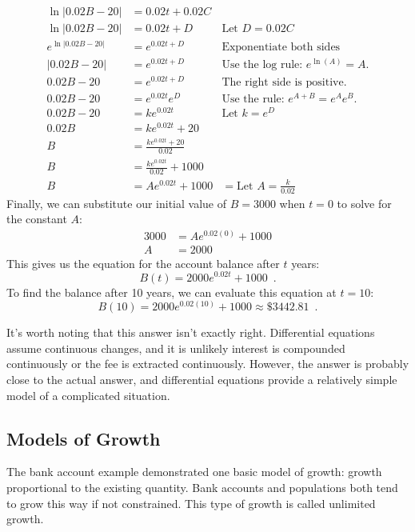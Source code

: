 \begin{example}
\begin{solution}
\begin{align*}
\ln|0.02B-20|     &= 0.02t+0.02C  \\
\ln|0.02B-20|     &= 0.02t+D      & \text{Let }D=0.02C\\
e^{\ln|0.02B-20|} &= e^{0.02t+D}  & \text{Exponentiate both sides}\\
|0.02B-20|        &= e^{0.02t+D}  & \text{Use the log rule: } e^{\ln(A)}=A.\\
0.02B-20          &= e^{0.02t+D}  & \text{The right side is positive.}\\
0.02B-20          &= e^{0.02t}e^D & \text{Use the rule: } e^{A+B}=e^Ae^B.\\
0.02B-20          &= ke^{0.02t}   & \text{Let } k=e^D\\
0.02B             &= ke^{0.02t} + 20   \\
B                 &= \frac{ke^{0.02t} + 20}{0.02} \\
B                 &= \frac{ke^{0.02t}}{0.02} + 1000 \\
B                 &= Ae^{0.02t}+1000 &= \text{Let } A = \frac{k}{0.02}
\end{align*}
Finally, we can substitute our initial value of $B=3000$ when $t=0$ to solve for the constant $A$:
\begin{align*}
3000  &= Ae^{0.02(0)}+1000 \\
A     &= 2000
\end{align*}
This gives us the equation for the account balance after $t$ years:
$$B(t)=2000e^{0.02t}+1000 \enspace .$$
To find the balance after 10 years, we can evaluate this equation at $t=10$:
$$B(10)=2000e^{0.02(10)}+1000 \approx   \$3442.81 \enspace .$$
\end{solution}\end{example}

It's worth noting that this answer isn't exactly right. Differential equations assume continuous changes, and it is unlikely interest is compounded continuously or the fee is extracted continuously. However, the answer is probably close to the actual answer, and differential equations provide a relatively simple model of a complicated situation.

\subsection{Models of Growth}
The bank account example demonstrated one basic model of growth: growth proportional to the existing quantity. Bank accounts and populations both tend to grow this way if not constrained. This type of growth is called unlimited growth.

